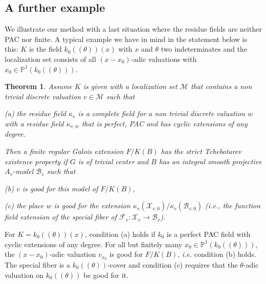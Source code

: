 \documentclass[12pt,english]{amsart}
\newtheorem{theorem}{Theorem}[section]
\newtheorem{twisting lemma}[theorem]{Twisting lemma}
\begin{document}
\subsection{A further example} We illustrate our method with a last situation where the residue 
fields are neither PAC nor finite. A typical example we have in mind in the statement below is this: $K$ is the field $k_0((\theta)) (x)$ with $x$ and 
$\theta$ two indeterminates and the localization set consists of all $(x-x_0)$-adic valuations with $x_0\in {\mathbb{P}}^1(k_0((\theta)))$.

\begin{theorem} \label{cor:further-example} 
Assume $K$ is given with a localization set ${\mathcal M}$ that contains a non trivial discrete 
valuation $v\in {\mathcal M}$ such that
\vskip 1mm

\noindent
{\rm (a)} the residue field $\kappa_v$ is a complete field for a non trivial discrete valuation $w$ 
with a residue field  ${\kappa}_{v,w}$ that is perfect, PAC and has cyclic extensions of any degree.
\vskip 1mm

\noindent
Then a  finite regular Galois extension $F/K(B)$ has the strict Tchebotarev existence property 
if $G$ is of trivial center and $B$ has an integral smooth projective $A_v$-model 
${\mathcal B}_v$ such that
\vskip 1mm

\noindent
{\rm (b)}  $v$ is good for this model of $F/K(B)$,
\vskip 1mm

\noindent
{\rm (c)} the place $w$ is good for the extension $\kappa_v({\mathcal X}_{v,0})/\kappa_v({\mathcal B}_{v,0})$ ({\it i.e.}, the function field extension of the special fiber of ${\mathcal F}_v: {\mathcal X}_v \rightarrow {\mathcal B}_v$).
\end{theorem}

For $K = k_0((\theta)) (x)$, condition (a) holds if  $k_0$ is a perfect PAC field with cyclic extensions of any degree. For all but finitely many $x_0\in {\mathbb{P}}^1(k_0((\theta)))$, the $(x-x_0)$-adic valuation $v_{x_0}$ is good for $F/K(B)$, {\it i.e.} condition (b) holds. The special fiber  
is a $k_0((\theta))$-cover and condition (c) requires that  the $\theta$-adic valuation on $k_0((\theta))$ be good for it.
\end{document}

